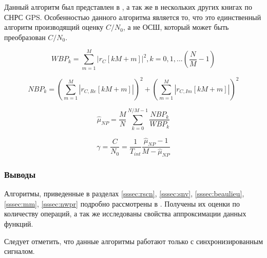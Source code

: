 Данный алгоритм был представлен в \cite{parkinson_1996}, а так же в нескольких других книгах по СНРС GPS. Особенностью данного алгоритма
является то, что это единственный алгоритм производящий оценку ${C/N_0}$, а не ОСШ, который может быть преобразован ${C/N_0}$.

\begin{center}
\begin{equation}
	WBP_k = \sum \limits_{m=1}^{M} \left|r_C[kM+m] \right| ^2, k=0,1,...(\frac{N}{M}-1)
\end{equation}
\end{center}

\begin{center}
\begin{equation}
	NBP_k = (\sum \limits_{m=1}^{M} \left|r_{C,Re}[kM+m] \right| )^2 + (\sum \limits_{m=1}^{M} \left|r_{C,Im}[kM+m] \right| )^2
\end{equation}
\end{center}

\begin{center}
\begin{equation}
	\hat \mu_{NP} = \frac{M}{N} \sum \limits_{k=0}^{N/M-1} \frac{NBP_k}{WBP_k}
\end{equation}
\end{center}

\begin{center}
\begin{equation}
	\gamma = \frac{C}{N_0} = \frac{1}{T_{int}} \frac{\hat \mu_{NP} - 1}{M - \hat \mu_{NP}}
\end{equation}
\end{center}

\subsubsection{Выводы}
Алгоритмы, приведенные в разделах \ref{sssec:rscn}, \ref{sssec:snv}, \ref{sssec:beaulieu}, \ref{sssec:mm}, \ref{sssec:nwpr}
подробно рассмотрены в \cite{presti_ieee}. Получены их оценки по количеству операций, а так же
исследованы свойства аппроксимации данных функций.

Следует отметить, что данные алгоритмы работают только с синхронизированным сигналом.

\newpage
